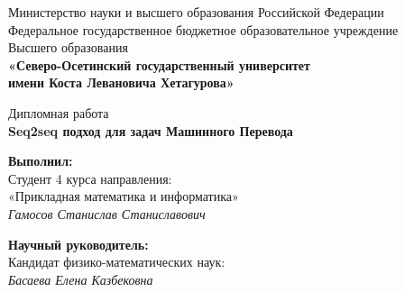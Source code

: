 \documentclass[a4paper,12pt]{article}
\begin{document}
	\setcounter{page}{0}
	\renewcommand{\labelenumii}{\arabic{enumi}.\arabic{enumii}.}
	
	
	\begin{center}
		\small{Министерство науки и высшего образования Российской Федерации}\\
		\small{Федеральное государственное бюджетное образовательное учреждение}\\
		\small{Высшего образования}\\
		\small{\textbf{«Северо-Осетинский государственный университет\\
				имени Коста Левановича Хетагурова»}}\\
		
		\hfill \break
		\hfill \break
		\hfill \break
		\hfill \break
		\hfill \break
		\hfill \break
		\hfill \break
		\hfill \break
		\hfill \break
		
		\normalsize{Дипломная работа}\\
		\large{\textbf{Seq2seq подход для задач Машинного Перевода}}\\
		
		\hfill \break
		\hfill \break
		\hfill \break
		\hfill \break
		\hfill \break
		\hfill\break
	\end{center}
	
	\begin{flushright}
		\textbf{Выполнил:}\\
		Студент 4 курса направления:\\
		«Прикладная математика и информатика»\\
		\textit{Гамосов Станислав Станиславович \underline{\hspace{3cm}}}\\
	\end{flushright}
	
	\hfill
	
	\begin{flushright}
		\textbf{Научный руководитель:}\\
		Кандидат физико-математических наук:\\
		\textit{Басаева Елена Казбековна \underline{\hspace{3cm}}}\\
	\end{flushright}
	
\end{document}
